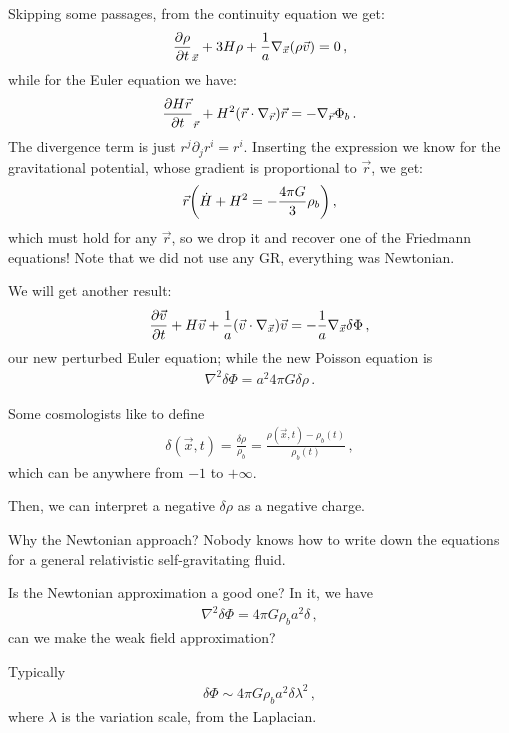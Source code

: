 \documentclass[main.tex]{subfiles}
\begin{document}
Skipping some passages, from the continuity equation we get:
%
\begin{align}
  \pdv{\rho }{t}_{\vec{x}} + 3 H \rho + 
  \frac{1}{a} \nabla_{\vec{x}} \qty(\rho \vec{v}) = 0
\,,
\end{align}
%
while for the Euler equation we have: 
%
\begin{align}
  \pdv{H \vec{r}}{t}_{\vec{r}} + H^2 \qty(\vec{r} \cdot \nabla_{\vec{r}}) \vec{r} = - \nabla_{\vec{r}} \Phi_{b}
\,. 
\end{align}
%
The divergence term is just \(r^{j} \partial_{j} r^{i} = r^{i}\). Inserting the expression we know for the gravitational potential, whose gradient is proportional to \(\vec{r}\), we get: 
%
\begin{align}
  \vec{r} \qty(\dot{H} +  H^2 = - \frac{4 \pi G }{3} \rho_{b } )
\,,
\end{align}
%
which must hold for any \(\vec{r}\), so we drop it and recover one of the Friedmann equations! 
Note that we did not use any GR, everything was Newtonian. 

We will get another result: 
%
\begin{align}
  \pdv{\vec{v}}{t} + H \vec{v} + \frac{1}{a} \qty(\vec{v} \cdot \nabla_{\vec{x}}) \vec{v} = - \frac{1}{a} \nabla_{\vec{x}} \delta \Phi 
\,,
\end{align}
%
our new perturbed Euler equation; while the new Poisson equation is 
%
\begin{align}
  \nabla^2 \delta \Phi = a^2 4 \pi G \delta \rho 
\,.
\end{align}

Some cosmologists like to define 
%
\begin{align}
  \delta (\vec{x}, t) = \frac{ \delta \rho}{\rho _b} = \frac{\rho (\vec{x}, t) - \rho _b (t)}{\rho _b (t)}
\,,
\end{align}
%
which can be anywhere from \(-1\) to \(+ \infty \). 

Then, we can interpret a negative \(\delta \rho \) as a negative charge. 

Why the Newtonian approach? Nobody knows how to write down the equations for a general relativistic self-gravitating fluid. 

Is the Newtonian approximation a good one? In it, we have 
%
\begin{align}
  \nabla^2 \delta \Phi  = 4 \pi G \rho _b a^2 \delta 
\,,
\end{align}
%
can we make the weak field approximation? 

Typically 
%
\begin{align}
  \delta \Phi \sim 4 \pi G \rho _b a^2 \delta \lambda^2
\,,
\end{align}
%
where \(\lambda \) is the variation scale, from the Laplacian. 
\end{document}
